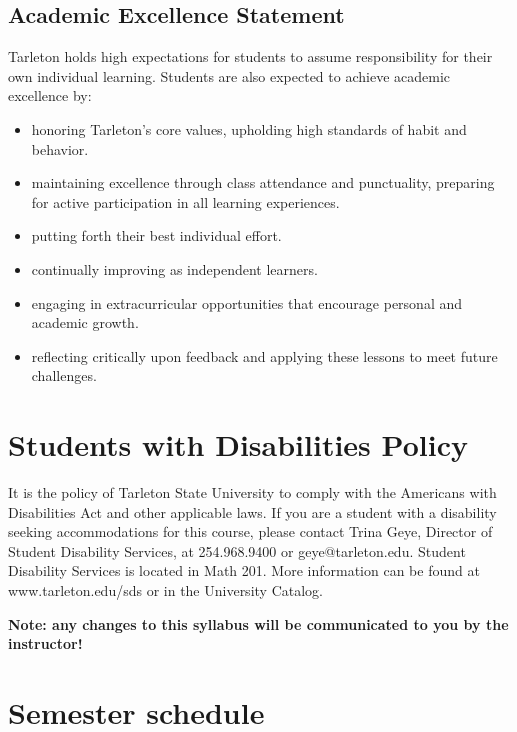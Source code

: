 \documentclass[10pt]{article}
\begin{document}
\subsection*{Academic Excellence Statement}
\label{sec-9-3}
Tarleton holds high expectations for students to assume responsibility for their own individual learning. Students are also expected to achieve academic excellence by:
\begin{itemize}
\item honoring Tarleton’s core values, upholding high standards of habit and behavior.
\item maintaining excellence through class attendance and punctuality, preparing for active participation in all learning experiences.
\item putting forth their best individual effort.
\item continually improving as independent learners.
\item engaging in extracurricular opportunities that encourage personal and academic growth.
\item reflecting critically upon feedback and applying these lessons to meet future challenges.
\end{itemize}

\section*{Students with Disabilities Policy}
\label{sec-10}

It is the policy of Tarleton State University to comply with the Americans
with Disabilities Act and other applicable laws. If you are a student with a
disability seeking accommodations for this course, please contact Trina
Geye, Director of Student Disability Services, at 254.968.9400 or
geye@tarleton.edu. Student Disability Services is
located in Math 201. More information can be found at www.tarleton.edu/sds or in the University Catalog.


\textbf{\textbf{Note:  any changes to this syllabus will be communicated to you by the instructor!}}

\section*{Semester schedule}
\label{sec-11}
\end{document}

